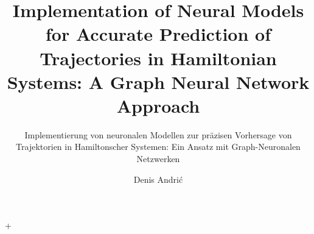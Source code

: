 \documentclass[
	ngerman,
	ruledheaders=section,%
	class=report,%
	thesis={type=master},%
	accentcolor=9c,%
	custommargins=true,%
	marginpar=false,%
	parskip=half-,%
	fontsize=11pt,%
]{tudapub}
\begin{document}

\title{Implementation of Neural Models for Accurate Prediction of Trajectories in Hamiltonian Systems: A Graph Neural Network Approach}
\subtitle{Implementierung von neuronalen Modellen zur präzisen Vorhersage von Trajektorien in Hamiltonscher Systemen: 
	Ein Ansatz mit Graph-Neuronalen Netzwerken}
\author[D. Andrić]{Denis Andrić}

\submissiondate{\today}
\examdate{\today}



\maketitle

\affidavit
%
\tableofcontents
\listoffigures
\listoftables+
\end{document}
